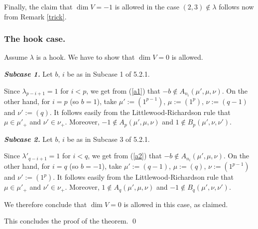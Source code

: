 \documentclass{amsart}
\theoremstyle{definition}
\begin{document}
Finally, the claim that $\dim V=-1$ is allowed in the case
$(2,3)\notin \lambda$ follows now from Remark \ref{trick}.

\subsubsection{\textbf{The hook case.}} Assume $\lambda$ is a hook. We have to
show that $\dim V=0$ is allowed.

\textbf{\emph{Subcase 1.}} Let $b,\,i$ be as in Subcase 1 of 5.2.1.

Since $\lambda_{p-i+1}=1$ for $i<p$, we get from (\ref{a1}) that
$-b\notin A_{n_i}(\mu',\mu,\nu)$. On the other hand, for $i=p$ (so
$b=1$), take $\mu':=(1^{p-1})$, $\mu:=(1^{p})$, $\nu:=(q-1)$ and
$\nu':=(q)$. It follows easily from the Littlewood-Richardson rule
that $\mu\in\mu'_+$ and $\nu'\in\nu_+$. Moreover, $-1\notin
A_p(\mu',\mu,\nu)$ and $1\notin B_p(\mu',\nu,\nu')$.

\textbf{\emph{Subcase 2.}} Let $b,\,i$ be as in Subcase 3 of 5.2.1.

Since $\lambda'_{q-i+1}=1$ for $i<q$, we get from (\ref{a2}) that
$-b\notin A_{n_i}(\mu',\mu,\nu)$. On the other hand, for $i=q$ (so
$b=-1$), take $\mu':=(q-1)$, $\mu:=(q)$, $\nu:=(1^{p-1})$ and
$\nu':=(1^{p})$. It follows easily from the Littlewood-Richardson
rule that $\mu\in\mu'_+$ and $\nu'\in\nu_+$. Moreover, $1\notin
A_q(\mu',\mu,\nu)$ and $-1\notin B_q(\mu',\nu,\nu')$.

We therefore conclude that $\dim V=0$ is allowed in this case, as
claimed.

This concludes the proof of the theorem. \qed
\end{document}
